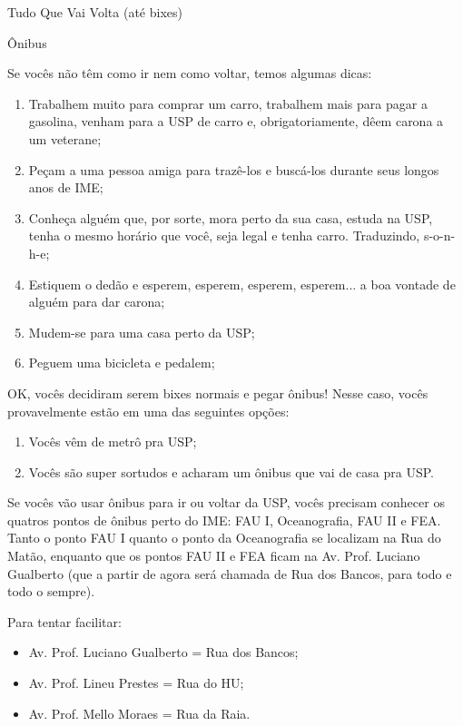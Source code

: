 \begin{secao}{Tudo Que Vai Volta (até bixes)}

\begin{subsecao}{Ônibus}

Se vocês não têm como ir nem como voltar, temos algumas dicas:

\begin{enumerate}
  \item Trabalhem muito para comprar um carro,
  trabalhem mais para pagar a gasolina,
  venham para a USP de carro e, obrigatoriamente, dêem carona a um veterane;

  \item Peçam a uma pessoa amiga para trazê-los e buscá-los durante seus
  longos anos de IME;

  \item Conheça alguém que, por sorte, mora perto da sua casa, estuda na USP,
  tenha o mesmo horário que você, seja legal e tenha carro. Traduzindo, s-o-n-h-e;

  \item Estiquem o dedão e esperem, esperem, esperem, esperem... a boa vontade
  de alguém para dar carona;

  \item Mudem-se para uma casa perto da USP;

  \item Peguem uma bicicleta e pedalem;

\end{enumerate}

OK, vocês decidiram serem bixes normais e pegar ônibus! Nesse caso, vocês
provavelmente estão em uma das seguintes opções:

\begin{enumerate}
  \item Vocês vêm de metrô pra USP;
  \item Vocês são super sortudos e acharam um ônibus que vai de casa pra USP.
\end{enumerate}

Se vocês vão usar ônibus para ir ou voltar da USP, vocês precisam conhecer
os quatros pontos de ônibus perto do IME: FAU I, Oceanografia, FAU II e FEA.
Tanto o ponto FAU I quanto o ponto da Oceanografia se localizam na Rua do Matão,
enquanto que os pontos FAU II e FEA ficam na Av. Prof. Luciano Gualberto (que a 
partir de agora será chamada de Rua dos Bancos, para todo e todo o sempre).

Para tentar facilitar:
\begin{itemize}
	\item Av. Prof. Luciano Gualberto = Rua dos Bancos;
	\item Av. Prof. Lineu Prestes = Rua do HU;
	\item Av. Prof. Mello Moraes = Rua da Raia.
\end{itemize}


\end{subsecao}
\end{secao}

